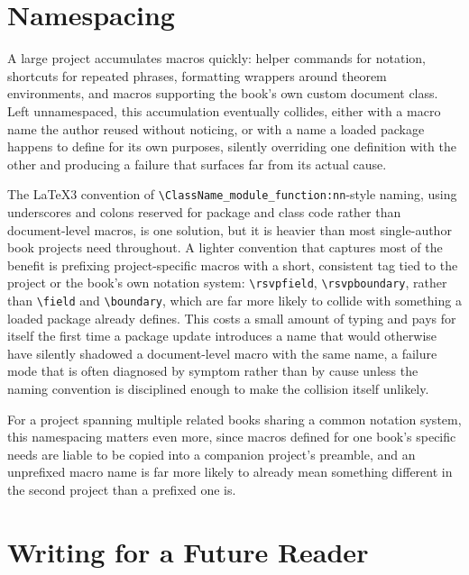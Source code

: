 \hypertarget{namespacing}{%
\section{Namespacing}\label{namespacing}}

A large project accumulates macros quickly: helper commands for notation, shortcuts for repeated phrases, formatting wrappers around theorem environments, and macros supporting the book's own custom document class. Left unnamespaced, this accumulation eventually collides, either with a macro name the author reused without noticing, or with a name a loaded package happens to define for its own purposes, silently overriding one definition with the other and producing a failure that surfaces far from its actual cause.

The LaTeX3 convention of \texttt{\textbackslash{}ClassName\_module\_function:nn}-style naming, using underscores and colons reserved for package and class code rather than document-level macros, is one solution, but it is heavier than most single-author book projects need throughout. A lighter convention that captures most of the benefit is prefixing project-specific macros with a short, consistent tag tied to the project or the book's own notation system: \texttt{\textbackslash{}rsvpfield}, \texttt{\textbackslash{}rsvpboundary}, rather than \texttt{\textbackslash{}field} and \texttt{\textbackslash{}boundary}, which are far more likely to collide with something a loaded package already defines. This costs a small amount of typing and pays for itself the first time a package update introduces a name that would otherwise have silently shadowed a document-level macro with the same name, a failure mode that is often diagnosed by symptom rather than by cause unless the naming convention is disciplined enough to make the collision itself unlikely.

For a project spanning multiple related books sharing a common notation system, this namespacing matters even more, since macros defined for one book's specific needs are liable to be copied into a companion project's preamble, and an unprefixed macro name is far more likely to already mean something different in the second project than a prefixed one is.

\hypertarget{writing-for-a-future-reader}{%
\section{Writing for a Future Reader}\label{writing-for-a-future-reader}}

